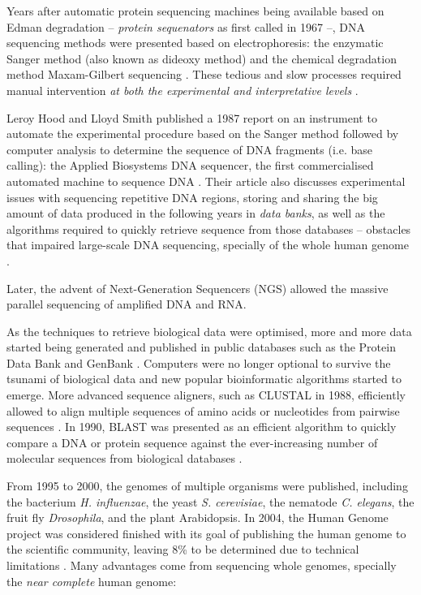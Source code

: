

Years after automatic protein sequencing machines being available based on Edman degradation -- \emph{protein sequenators} as first called in 1967 \cite{edman:1967tc} --, DNA sequencing methods were presented based on electrophoresis: the enzymatic Sanger method (also known as dideoxy method) \cite{sanger:1977vp} and the chemical degradation method Maxam-Gilbert sequencing \cite{maxam:1977vy}. These tedious and slow processes required manual intervention \emph{at both the experimental and interpretative levels} \cite{hood:1987va}.

Leroy Hood and Lloyd Smith published a 1987 report on an instrument to automate the experimental procedure based on the Sanger method followed by computer analysis to determine the sequence of DNA fragments (i.e. base calling): the Applied Biosystems DNA sequencer, the first commercialised automated machine to sequence DNA \cite{hood:1987va}. Their article also discusses experimental issues with sequencing repetitive DNA regions, storing and sharing the big amount of data produced in the following years in \emph{data banks}, as well as the algorithms required to quickly retrieve sequence from those databases -- obstacles that impaired large-scale DNA sequencing, specially of the whole human genome \cite{hood:1987va}.

Later, the advent of Next-Generation Sequencers (NGS) allowed the massive parallel sequencing of amplified DNA and RNA.

As the techniques to retrieve biological data were optimised, more and more data started being generated and published in public databases such as the Protein Data Bank \cite{protein-data-bank:1971tm} and GenBank \cite{burks:1985ts}. Computers were no longer optional to survive the tsunami of biological data and new popular bioinformatic algorithms started to emerge. More advanced sequence aligners, such as CLUSTAL in 1988, efficiently allowed to align multiple sequences of amino acids or nucleotides from pairwise sequences \cite{higgins:1988ul}. In 1990, BLAST was presented as an efficient algorithm to quickly compare a DNA or protein sequence against the ever-increasing number of molecular sequences from biological databases \cite{altschul:1990vt}.

From 1995 to 2000, the genomes of multiple organisms were published, including the bacterium \emph{H. influenzae}, the yeast \emph{S. cerevisiae}, the nematode \emph{C. elegans}, the fruit fly \emph{Drosophila}, and the plant Arabidopsis. In 2004, the Human Genome project was considered finished with its goal of publishing the human genome to the scientific community, leaving 8\% to be determined due to technical limitations \cite{consortium:2004wi,nurk:2021up}. Many advantages come from sequencing whole genomes, specially the \emph{near complete} human genome:

